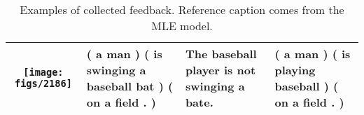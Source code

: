 \begin{table}[t!]
\begin{minipage}{0.49\linewidth}
\begin{tabular}{ | c |p{1.5cm}|p{1.3cm}|p{1.8cm}|}
        \begin{minipage}{.2\textwidth}
      \vspace{0.5mm}
      \texttt{[image: figs/2186]}
      \vspace{-7mm}
    \end{minipage}    
    &
    ( a man ) ( is swinging a baseball bat ) ( on a field . )
    & 
       The baseball player is not swinging a bate.
    & 
       ( a man ) ( is playing baseball ) ( on a field . )
    \\ \hline
  \end{tabular}
  \end{minipage}
  \caption{\small Examples of collected feedback. Reference caption comes from the MLE model. }\label{tbl:myLboro}
  \vspace{-3mm}
\end{table}




